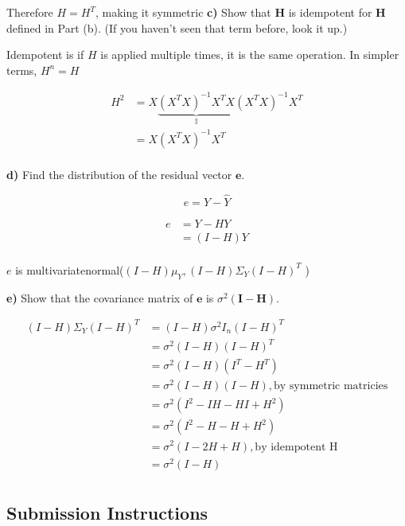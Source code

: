 \documentclass[11pt]{article}
\begin{document}
Therefore $H = H^{T}$, making it symmetric
\textbf{c)} Show that \(\mathbf{H}\) is idempotent for \(\mathbf{H}\)
defined in Part (b). (If you haven't seen that term before, look it up.)

Idempotent is if $H$ is applied multiple times, it is the same operation. In simpler terms, $H^{n} = H$ 


\begin{align*}
	H^{2} &= X\underbrace{(X^{T}X)^{-1}X^{T} X}_{\mathbb{I}}(X^{T}X)^{-1} X^{T} \\
	&=  X (X^{T}X)^{-1}X^{T}\\
\end{align*}



\textbf{d)} Find the distribution of the residual vector \(\mathbf{e}\).

\[
e = Y - \hat Y
\]

\begin{align*}
e &= Y - HY \\
&= (I-H)Y \\
\end{align*}

$e$ is multivariatenormal($(I-H) \mu _{Y}, (I-H) \Sigma_{Y} (I-H)^{T}$  )



\textbf{e)} Show that the covariance matrix of \(\mathbf{e}\) is
\(\sigma^2(\mathbf{I} - \mathbf{H})\).



\begin{align*}
	(I-H)\Sigma_Y(I-H)^{T} &= (I-H) \sigma^{2}I_{n} (I-H)^{T} \\
	&= \sigma^{2} (I-H) (I-H)^{T} \\
	&= \sigma^{2} (I - H) ( I^{T} - H^{T}) \\
	&= \sigma^{2}(I-H)(I - H), \text{by symmetric matricies} \\
	&= \sigma^{2}( I^{2} - IH - HI + H^{2}) \\
	&= \sigma^{2} (I^{2} - H - H + H^{2}) \\
	&= \sigma^{2} (I - 2H + H) , \text{by idempotent H}\\
	&= \sigma^{2} (I - H) \\
\end{align*}







    \newpage

    \hypertarget{submission-instructions}{%
\subsection{Submission Instructions}\label{submission-instructions}}
\end{document}
